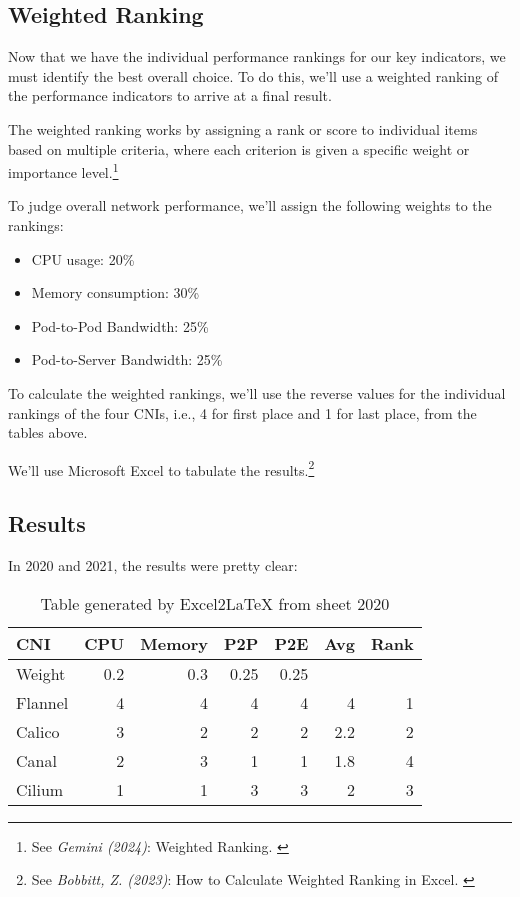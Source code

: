 \subsection{Weighted Ranking}

Now that we have the individual performance rankings for our key indicators, we must identify the best overall choice. To do this, we'll use a weighted ranking of the performance indicators to arrive at a final result.

The weighted ranking works by assigning a rank or score to individual items based on multiple criteria, where each criterion is given a specific weight or importance level.\footnote{See \textit{Gemini (2024)}: Weighted Ranking. \cite{bardWeigthed}}

To judge overall network performance, we'll assign the following weights to the rankings:

\begin{itemize}
    \item CPU usage: 20\%
    \item Memory consumption: 30\%
    \item Pod-to-Pod Bandwidth: 25\%
    \item Pod-to-Server Bandwidth: 25\%
\end{itemize}

To calculate the weighted rankings, we'll use the reverse values for the individual rankings of the four CNIs, i.e., 4 for first place and 1 for last place, from the tables above.

We'll use Microsoft Excel to tabulate the results.\footnote{See \textit{Bobbitt, Z. (2023)}: How to Calculate Weighted Ranking in Excel. \cite{howtoWeigh}}

\subsection{Results}

In 2020 and 2021, the results were pretty clear:

\begin{table}[H]
  \caption{Table generated by Excel2LaTeX from sheet 2020}
    \begin{tabular}{|l | r | r | r | r| r | r |}
    \hline
    CNI   & CPU & Memory & P2P & P2E & Avg & Rank \\
    \hline\hline
    Weight & 0.2   & 0.3   & 0.25  & 0.25  &       &  \\
    \hline
    Flannel & 4     & 4     & 4     & 4     & 4     & 1 \\
    \hline
    Calico & 3     & 2     & 2     & 2     & 2.2   & 2 \\
    \hline
    Canal & 2     & 3     & 1     & 1     & 1.8   & 4 \\
    \hline
    Cilium & 1     & 1     & 3     & 3     & 2     & 3 \\
    \hline
    \end{tabular}%
  \label{tab:e2l-2020}%
\end{table}%

